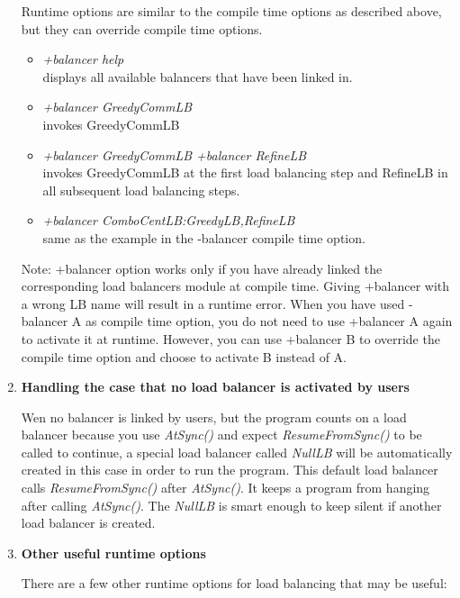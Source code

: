 \begin{enumerate}
Runtime options are similar to the compile time options as described above,
but they can override compile time options.

\begin{itemize}
\item {\em +balancer help} \\
  displays all available balancers that have been linked in.
\item {\em +balancer GreedyCommLB} \\
  invokes GreedyCommLB
\item {\em +balancer GreedyCommLB +balancer RefineLB} \\
  invokes GreedyCommLB at the first load balancing step and RefineLB in all
subsequent load balancing steps.
\item {\em +balancer ComboCentLB:GreedyLB,RefineLB}  \\
  same as the example in the -balancer compile time option.
\end{itemize}

Note: +balancer option works only if you have already linked the corresponding 
load balancers module at compile time. 
Giving +balancer with a wrong LB name will result in a runtime error.
When you have used -balancer A as compile time option, you do not need to use 
+balancer A again to activate it at runtime. However, you can 
use +balancer B to override the compile time option and choose to
activate B instead of A.

\item {\bf Handling the case that no load balancer is activated by users}

Wen no balancer is linked by users, 
but the program counts on a load balancer because you use {\em AtSync()}
and expect {\em ResumeFromSync()} to be called to continue,
a special load balancer called {\em NullLB} will be 
automatically created in this case in order to run the program.
This default load balancer calls {\em ResumeFromSync()} after {\em AtSync()}. 
It keeps a program from hanging after calling {\em AtSync()}.
The {\em NullLB} is smart enough to keep silent if another 
load balancer is created.

\item {\bf Other useful runtime options}

There are a few other runtime options for load balancing that may be useful:


\end{enumerate}
